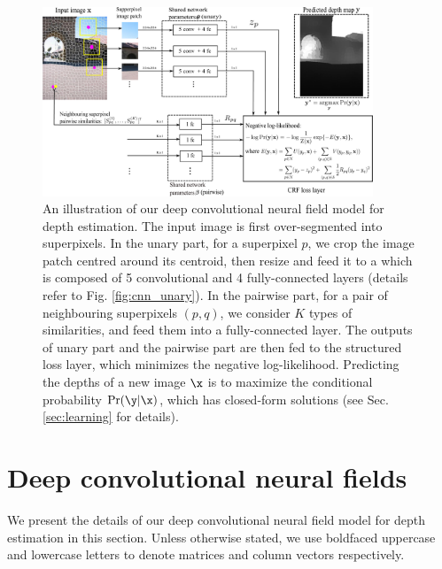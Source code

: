 

\begin{figure}[!t] \center
	\includegraphics[width=0.88\textwidth]{./fig/cnn_network.pdf}
\caption{An illustration of our deep convolutional neural field model for depth estimation. 
The input image is first over-segmented into superpixels. 
In the unary part, for a superpixel $p$, we crop the image patch centred around its centroid, 
%
then resize and feed it to a \cnn which is composed of 5 convolutional and 4 fully-connected layers (details refer to Fig. \ref{fig:cnn_unary}).
In the pairwise part,
for a pair of neighbouring superpixels $(p, q)$, we consider $K$ types of similarities, and feed them into a fully-connected layer. 
The outputs of unary part and the pairwise part are then fed to the \crf structured loss layer, which minimizes the negative log-likelihood.     
Predicting the depths of a new image $\x$ is to maximize the conditional probability $\Pr(\y|\x)$, which has closed-form solutions (see Sec. \ref{sec:learning} for details).
}  \label{fig:cnn_ccrf}
\end{figure}






%
\section{Deep convolutional neural fields}



%
We present the details of our deep convolutional neural field model for depth estimation in this section. Unless otherwise stated, we use boldfaced uppercase and lowercase letters to denote matrices and column vectors respectively.
%


%
